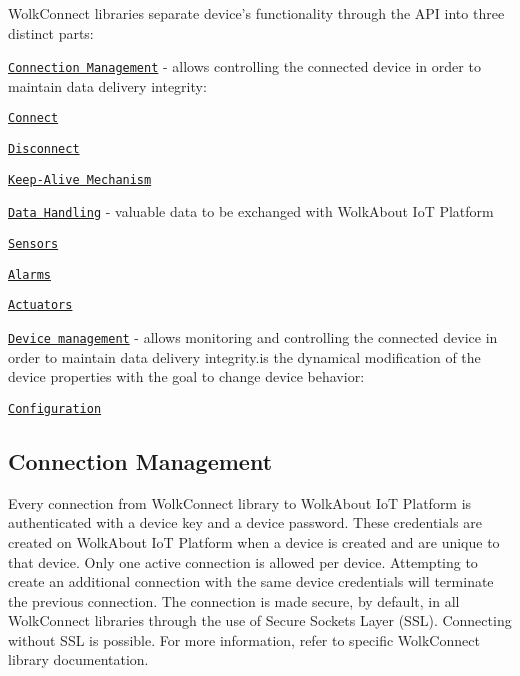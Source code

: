  Wolk\+Connect libraries separate device’s functionality through the A\+PI into three distinct parts\+:


\begin{DoxyItemize}
\item \href{#connection-management}{\tt Connection Management} -\/ allows controlling the connected device in order to maintain data delivery integrity\+:
\begin{DoxyItemize}
\item \href{#connect}{\tt Connect}
\item \href{#disconnect}{\tt Disconnect}
\item \href{#keep-alive-mechanism}{\tt Keep-\/\+Alive Mechanism}
\end{DoxyItemize}
\item \href{#data-handling}{\tt Data Handling} -\/ valuable data to be exchanged with Wolk\+About IoT Platform
\begin{DoxyItemize}
\item \href{#sensor-readings}{\tt Sensors}
\item \href{#alarms}{\tt Alarms}
\item \href{#actuators}{\tt Actuators}
\end{DoxyItemize}
\item \href{#device-managment}{\tt Device management} -\/ allows monitoring and controlling the connected device in order to maintain data delivery integrity.\+is the dynamical modification of the device properties with the goal to change device behavior\+:
\begin{DoxyItemize}
\item \href{#configuration}{\tt Configuration} 


\end{DoxyItemize}
\end{DoxyItemize}

\label{_connection-management}%
 \subsection*{Connection Management}



 

Every connection from Wolk\+Connect library to Wolk\+About IoT Platform is authenticated with a device key and a device password. These credentials are created on Wolk\+About IoT Platform when a device is created and are unique to that device. Only one active connection is allowed per device. Attempting to create an additional connection with the same device credentials will terminate the previous connection. The connection is made secure, by default, in all Wolk\+Connect libraries through the use of Secure Sockets Layer (S\+SL). Connecting without S\+SL is possible. For more information, refer to specific Wolk\+Connect library documentation.


